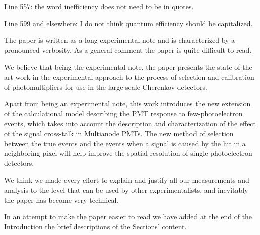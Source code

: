 \documentclass[11pt]{report}
\begin{document}
\begin{tcolorbox}[enlarge top by=2em,colbacktitle=black!60!white,colframe=black!80!white,left=0pt,right=0pt,top=0pt,bottom=0pt,boxrule=0.3pt,title=\bfseries1.13 and 1.14]
Line 557:  the word inefficiency does not need to be in quotes.

Line 599 and elsewhere:  I do not think quantum efficiency should be capitalized.
\end{tcolorbox}








\clearpage






\begin{tcolorbox}[enlarge top by=2em,colbacktitle=blue!60!white,colframe=black!80!white,left=0pt,right=0pt,top=0pt,bottom=0pt,boxrule=0.3pt,title=\bfseries2.01]
The paper is written as a long experimental note and is characterized by a pronounced verbosity. As a general comment the paper is quite difficult to read.
\end{tcolorbox}

We believe that being the experimental note, the paper presents the state of the art work in the experimental approach to the process of selection and calibration of photomultipliers for use in the large scale Cherenkov detectors. 

Apart from being an experimental note, this work introduces the new extension of the calculational model describing the PMT response to few-photoelectron events, which takes into account the description and characterization of the effect of the signal cross-talk in Multianode PMTs. The new method of selection between the true events and the events when a signal is caused by the hit in a neighboring pixel will help improve the spatial resolution of single photoelectron detectors. 

We think we made every effort to explain and justify all our measurements and analysis to the level that can be used by other experimentalists, and inevitably the paper has become very technical. 

In an attempt to make the paper easier to read we have added at the end of the Introduction the brief descriptions of the Sections' content.
\end{document}
